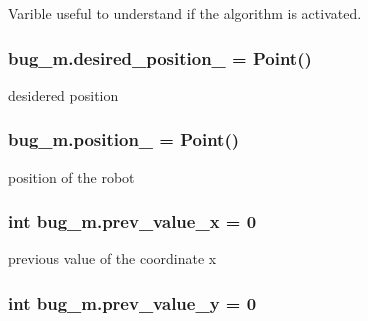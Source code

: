 Varible useful to understand if the algorithm is activated. 

\subsubsection[{\texorpdfstring{desired\+\_\+position\+\_\+}{desired_position_}}]{\setlength{\rightskip}{0pt plus 5cm}bug\+\_\+m.\+desired\+\_\+position\+\_\+ = Point()}\hypertarget{namespacebug__m_a8fb60e35f164091fe3355d3a0bce95af}{}\label{namespacebug__m_a8fb60e35f164091fe3355d3a0bce95af}


desidered position 

\subsubsection[{\texorpdfstring{position\+\_\+}{position_}}]{\setlength{\rightskip}{0pt plus 5cm}bug\+\_\+m.\+position\+\_\+ = Point()}\hypertarget{namespacebug__m_ab108d02234aa3ec58605b9f6980ec090}{}\label{namespacebug__m_ab108d02234aa3ec58605b9f6980ec090}


position of the robot 

\subsubsection[{\texorpdfstring{prev\+\_\+value\+\_\+x}{prev_value_x}}]{\setlength{\rightskip}{0pt plus 5cm}int bug\+\_\+m.\+prev\+\_\+value\+\_\+x = 0}\hypertarget{namespacebug__m_a1ab2c8fb582b2d935edf3a0193a45a15}{}\label{namespacebug__m_a1ab2c8fb582b2d935edf3a0193a45a15}


previous value of the coordinate x 

\subsubsection[{\texorpdfstring{prev\+\_\+value\+\_\+y}{prev_value_y}}]{\setlength{\rightskip}{0pt plus 5cm}int bug\+\_\+m.\+prev\+\_\+value\+\_\+y = 0}\hypertarget{namespacebug__m_a4fc6d4a9e55a524cbc2a80a7f0d57553}{}\label{namespacebug__m_a4fc6d4a9e55a524cbc2a80a7f0d57553}



